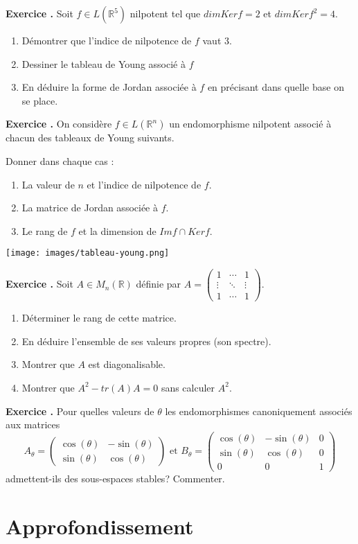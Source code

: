 \documentclass[10pt,a4paper]{article}
\def\bf#1{\textbf{#1}}
\newcounter{nexo}
\newcommand{\exo}{\medskip\noindent \bf{ Exercice \thenexo. \stepcounter{nexo}}}
\def\be{\begin{enumerate}}
\def\ee{\end{enumerate}}
\def\R{\mathbb{R}}
\def\mat#1{\begin{pmatrix}#1\end{pmatrix}}
\begin{document}
\exo Soit $f\in L(\R^5)$ nilpotent tel que $dim Ker f = 2$ et $dim Ker f^2 = 4$. 
\be
\item Démontrer que l'indice de nilpotence de $f$ vaut 3.
\item Dessiner le tableau de Young associé à $f$
\item En déduire la forme de Jordan associée à $f$ en précisant dans quelle base on se place.
\ee

\exo
On considère $f\in L(\R^n)$  un endomorphisme nilpotent  associé à chacun des tableaux de Young suivants. \\
\begin{minipage}{8cm}
Donner dans  chaque cas : 
\be
\item La valeur de $n$ et l'indice de nilpotence de $f$.
\item La matrice de Jordan associée à $f$.
\item Le rang de $f$ et la dimension de $Im f \cap Ker f $. 
\ee
\end{minipage}
\begin{minipage}{8cm}\quad
\texttt{[image: images/tableau-young.png]}
\end{minipage}



\exo Soit $A\in M_n(\R)$ définie par 
$A=\mat{1&\cdots&1\\\vdots& \ddots& \vdots\\1&\cdots&1}$. \be
\item Déterminer le rang de cette matrice. 
\item En déduire l'ensemble de ses valeurs propres (son spectre).
\item Montrer que $A$ est diagonalisable. 
\item Montrer que $A^2-tr(A)A=0$ sans calculer $A^2$. 
\ee


\exo 
Pour quelles valeurs de $\theta$ les endomorphismes canoniquement associés aux matrices
%
\begin{equation*}
 A_{\theta}= \mat{\cos(\theta)&-\sin(\theta)\\ \sin(\theta)&\cos(\theta)}
 \mbox{ et }
B_{\theta}= \mat{\cos(\theta)&-\sin(\theta)&0\\ \sin(\theta)&\cos(\theta)& 0\\0 & 0 & 1}
\end{equation*}
%
admettent-ils des sous-espaces stables? Commenter.


\section{Approfondissement}
\end{document}

